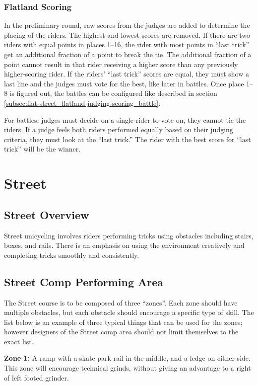 \subsection{Flatland Scoring}
In the preliminary round, raw scores from the judges are added to determine the placing of the riders.
The highest and lowest scores are removed.
If there are two riders with equal points in places 1–16, the rider with most points in ``last trick'' get an additional fraction of a point to break the tie.
The additional fraction of a point cannot result in that rider receiving a higher score than any previously higher-scoring rider.
If the riders' ``last trick'' scores are equal, they must show a last line and the judges must vote for the best, like later in battles.
Once place 1–8 is figured out, the battles can be configured like described in section \ref{subsec:flat-street_flatland-judging-scoring_battle}.

For battles, judges must decide on a single rider to vote on, they cannot tie the riders.
If a judge feels both riders performed equally based on their judging criteria, they must look at the ``last trick.''
The rider with the best score for ``last trick'' will be the winner.

\chapter{Street}

\section{Street Overview \label{sec:flat-street_street-overview}}
Street unicycling involves riders performing tricks using obstacles including stairs, boxes, and rails.
There is an emphasis on using the environment creatively and completing tricks smoothly and consistently.

\section{Street Comp Performing Area \label{sec:flat-street_street-performing-area}}
The Street course is to be composed of three ``zones''.
Each zone should have multiple obstacles, but each obstacle should encourage a specific type of skill.
The list below is an example of three typical things that can be used for the zones; however designers of the Street comp area should not limit themselves to the exact list.

\textbf{Zone 1:}
A ramp with a skate park rail in the middle, and a ledge on either side.
This zone will encourage technical grinds, without giving an advantage to a right of left footed grinder.

